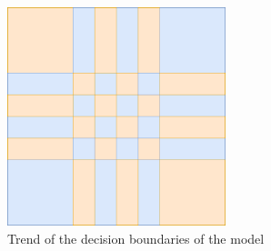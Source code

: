 \documentclass[compsoc]{IEEEtran}
\begin{document}
\begin{figure}[ht!]
\centering                                                                        
\includegraphics[width=2.5in]{../images/trend.png}
\captionsetup{justification=centering}                                                                                                                                   
\caption{Trend of the decision boundaries of the model}
\label{fig:trend}                                                                                                                                                           
\end{figure}
\end{document}
